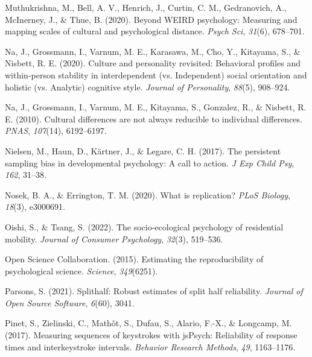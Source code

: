 \documentclass[
  man,floatsintext]{apa6}
\newlength{\cslhangindent}
\newlength{\cslentryspacingunit} %
\newenvironment{CSLReferences}[2] %
 {%
  \setlength{\parindent}{0pt}
  \ifodd #1
  \let\oldpar\par
  \def\par{\hangindent=\cslhangindent\oldpar}
  \fi
  \setlength{\parskip}{#2\cslentryspacingunit}
 }%
 {}
\begin{document}
\begin{CSLReferences}{1}{0}
\leavevmode{}%
Muthukrishna, M., Bell, A. V., Henrich, J., Curtin, C. M., Gedranovich, A., McInerney, J., \& Thue, B. (2020). Beyond WEIRD psychology: Measuring and mapping scales of cultural and psychological distance. \emph{Psych Sci}, \emph{31}(6), 678--701.

\leavevmode{}%
Na, J., Grossmann, I., Varnum, M. E., Karasawa, M., Cho, Y., Kitayama, S., \& Nisbett, R. E. (2020). Culture and personality revisited: Behavioral profiles and within-person stability in interdependent (vs. Independent) social orientation and holistic (vs. Analytic) cognitive style. \emph{Journal of Personality}, \emph{88}(5), 908--924.

\leavevmode{}%
Na, J., Grossmann, I., Varnum, M. E., Kitayama, S., Gonzalez, R., \& Nisbett, R. E. (2010). Cultural differences are not always reducible to individual differences. \emph{PNAS}, \emph{107}(14), 6192--6197.

\leavevmode{}%
Nielsen, M., Haun, D., Kärtner, J., \& Legare, C. H. (2017). The persistent sampling bias in developmental psychology: A call to action. \emph{J Exp Child Psy}, \emph{162}, 31--38.

\leavevmode{}%
Nosek, B. A., \& Errington, T. M. (2020). What is replication? \emph{PLoS Biology}, \emph{18}(3), e3000691.

\leavevmode{}%
Oishi, S., \& Tsang, S. (2022). The socio-ecological psychology of residential mobility. \emph{Journal of Consumer Psychology}, \emph{32}(3), 519--536.

\leavevmode{}%
Open Science Collaboration. (2015). Estimating the reproducibility of psychological science. \emph{Science}, \emph{349}(6251).

\leavevmode{}%
Parsons, S. (2021). Splithalf: Robust estimates of split half reliability. \emph{Journal of Open Source Software}, \emph{6}(60), 3041.

\leavevmode{}%
Pinet, S., Zielinski, C., Mathôt, S., Dufau, S., Alario, F.-X., \& Longcamp, M. (2017). Measuring sequences of keystrokes with jsPsych: Reliability of response times and interkeystroke intervals. \emph{Behavior Research Methods}, \emph{49}, 1163--1176.


\end{CSLReferences}
\end{document}

